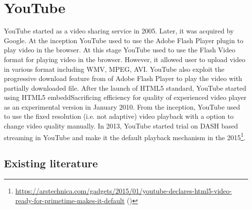 \section{YouTube}
YouTube started as a video sharing service in 2005. Later, it was acquired by Google. At the inception YouTube used to use the Adobe Flash Player plugin to play video in the browser. At this stage YouTube used to use the Flash Video format for playing video in the browser. However, it allowed user to upload video in various format including WMV, MPEG, AVI. YouTube also exploit the progressive download feature from of Adobe Flash Player to play the video with partially downloaded file\cite{gill2007youtube}. After the launch of HTML5 standard, YouTube started using HTML5 embeddSacrificing efficiency for quality of experienced video player as an experimental version in January 2010. From the inception, YouTube used to use the fixed resolution (i.e. not adaptive) video playback with a option to change video quality manually.
In 2013, YouTube started trial on DASH based streaming in YouTube and make it the default playback mechanism in the 2015\footnote{\url{https://arstechnica.com/gadgets/2015/01/youtube-declares-html5-video-ready-for-primetime-makes-it-default} (\lastaccessedtoday)}.

\subsection{Existing literature}
\label{chap02:youtube:lit}
